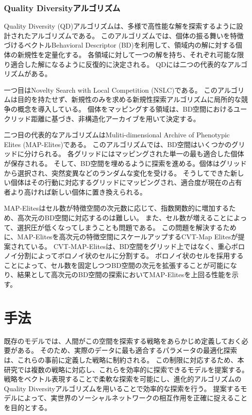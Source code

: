 \documentclass[uplatex,11pt,openany]{ujreport}
\begin{document}
        \subsection{Quality Diversityアルゴリズム}
        Quality Diversity (QD)アルゴリズムは、多様で高性能な解を探索するように設計されたアルゴリズムである\cite{pughQualityDiversityNew2016}。
        このアルゴリズムでは、個体の振る舞いを特徴づけるベクトルBehavioral Descriptor (BD)を利用して、領域内の解に対する個体の新規性を定量化する。
        各領域に対して一つの解を持ち、それぞれ可能な限り適合した解になるように反復的に決定される。
        QDには二つの代表的なアルゴリズムがある。

        一つ目はNovelty Search with Local Competition (NSLC)\cite{lehmanEvolvingDiversityVirtual2011}である。
        このアルゴリムは目的を持たせず、新規性のみを求める新規性探索アルゴリズム\cite{lehman_NoveltySearchProblemObjectives_2011}に局所的な競争の概念を導入している。
        個体をマッピングする領域は、BD空間におけるユークリッド距離に基づき、非構造化アーカイブを用いて決定する。

        二つ目の代表的なアルゴリズムはMuliti-dimensional Archive of Phenotypic Elites (MAP-Elites)\cite{mouretIlluminatingSearchSpaces2015}である。
        このアルゴリズムでは、BD空間はいくつかのグリッドに分けられる。
        各グリッドにはマッピングされた単一の最も適合した個体が保存される。
        そして、BD空間を埋めるように探索を進める。個体はグリッドから選択され、突然変異などのランダムな変化を受ける。
        そうしてできた新しい個体はその行動に対応するグリッドにマッピングされ、適合度が現在の占有者より高ければ新しい個体に置き換えられる。

        MAP-Elitesはセル数が特徴空間の次元数に応じて、指数関数的に増加するため、高次元のBD空間に対応するのは難しい。
        また、セル数が増えることによって、選択圧が低くなってしまうことも問題である。
        この問題を解決するために、MAP-Elitesを高次元の特徴空間にスケールアップするCVT-Map Elites\cite{vassiliadesUsingCentroidalVoronoi2017}が提案されている。
        CVT-MAP-Elitesは、BD空間をグリッド上ではなく、重心ボロノイ分割によってボロノイ状のセルに分割する。
        ボロノイ状のセルを採用することによって、セル数を固定しつつBD空間の次元を拡張することが可能になり、結果として高次元のBD空間の探索においてMAP-Elitesを上回る性能を示す。


\chapter{手法}
    既存のモデルでは、人間がこの空間を探索する戦略をあらかじめ定義しておく必要がある。
    そのため、実際のデータに最も適合するパラメータの最適化探索は、これらの事前に定義した戦略に制約される\cite{sudaExplorationExploitationAdjacent2022, sudaAgentbasedModelUsing2022,ubaldiEmergenceEvolutionSocial2021}。
    この制限に対応するため、本研究では複数の戦略に対応し、これらを効率的に探索できるモデルを提案する。
    戦略をベクトル表現することで柔軟な探索を可能にし、進化的アルゴリズムのQuality Diversityアルゴリズムを用いることで効率的な探索を行う。
    提案するモデルによって、実世界のソーシャルネットワークの相互作用を正確に捉えることを目的とする。
\end{document}
